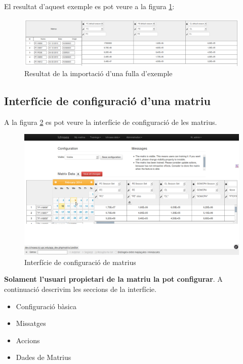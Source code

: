 El resultat d'aquest exemple es pot veure a la figura \ref{fig:matrixResulting}:
\begin{figure}[h!]
  \centering
  \includegraphics[scale=0.3]{img/userguide/matrix_resulting.png}
  \caption{Resultat de la importació d'una fulla d'exemple}
  \label{fig:matrixResulting}
\end{figure}

\subsection{Interfície de configuració d'una matriu}
\label{subsec:interfaceConfiguration}
A la figura \ref{fig:configure_matrix} es pot veure la interfície de configuració de les matrius.
\begin{figure}[h!]
  \centering
  \includegraphics[scale=0.2]{img/userguide/matrix_configure.png}
  \caption{Interfície de configuraci\'{o} de matrius}
  \label{fig:configure_matrix}
\end{figure}

\textbf{Solament l'usuari propietari de la matriu la pot configurar}. A continuació descrivim les seccions de la interfície.
\begin{itemize}
\item Configuració bàsica
\item Missatges
\item Accions
\item Dades de Matrius
\end{itemize}


